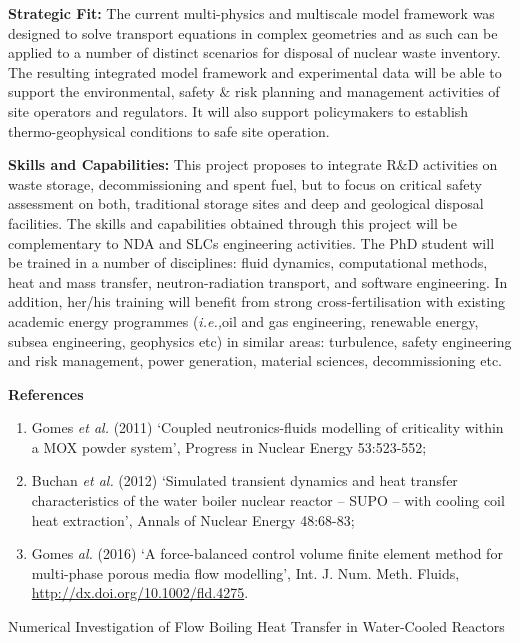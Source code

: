 \documentclass[14pt,twoside]{report}
\newcommand{\ie}{{\it i.e.,}}
\begin{document}
{\bf Strategic Fit:} The current multi-physics and multiscale model framework was designed to solve transport equations in complex geometries and as such can be applied to a number of distinct scenarios for disposal of nuclear waste inventory. The resulting integrated model framework and experimental data will be able to support the environmental, safety $\&$ risk planning and management activities of site operators and regulators. It will also support policymakers to establish thermo-geophysical conditions to safe site operation.

{\bf Skills and Capabilities:} This project proposes to integrate R$\&$D activities on waste storage, decommissioning and spent fuel, but to focus on critical safety assessment on both, traditional storage sites and deep and geological disposal facilities. The skills and capabilities obtained through this project will be complementary to NDA and SLCs engineering activities.  The PhD student will be trained in a number of disciplines: fluid dynamics, computational methods, heat and mass transfer, neutron-radiation transport, and software engineering. In addition, her/his training will benefit from strong cross-fertilisation with existing academic energy programmes (\ie oil and gas engineering, renewable energy, subsea engineering, geophysics etc) in similar areas: turbulence, safety engineering and risk management, power generation, material sciences, decommissioning etc.

{\bf References}
\begin{enumerate}
   \item Gomes {\it et al.} (2011) `Coupled neutronics-fluids modelling of criticality within a MOX powder system', Progress in Nuclear Energy 53:523-552;
   \item Buchan {\it et al.} (2012) `Simulated transient dynamics and heat transfer characteristics of the water boiler nuclear reactor – SUPO – with cooling coil heat extraction', Annals of Nuclear Energy 48:68-83;
   \item Gomes {\it al.} (2016) `A force-balanced control volume finite element method for multi-phase porous media flow modelling', Int. J. Num. Meth. Fluids, \href{http://dx.doi.org/10.1002/fld.4275}{http://dx.doi.org/10.1002/fld.4275}.

\end{enumerate}

\pagebreak


\begin{center}
   \large{Numerical Investigation of Flow Boiling Heat Transfer in Water-Cooled Reactors}
\end{center}
  
\end{document}
